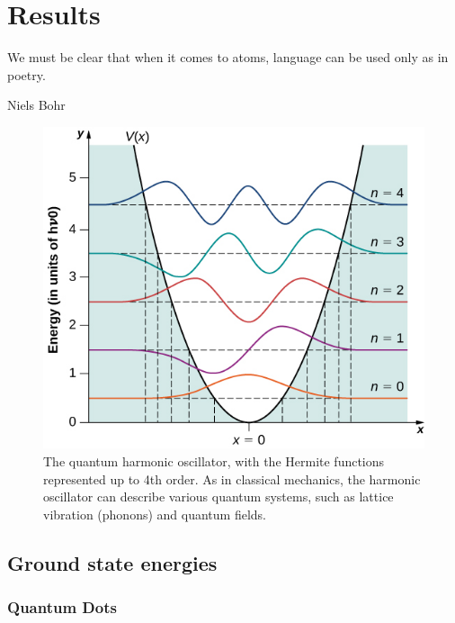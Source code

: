 \chapter{Results} \label{sec:results}
\epigraph{We must be clear that when it comes to atoms, language can be used only as in poetry.}{Niels Bohr}
\begin{figure}[H]
	\centering
	\includegraphics[scale=0.9]{Images/qho.jpg}
	\caption{The quantum harmonic oscillator, with the Hermite functions represented up to 4th order. As in classical mechanics, the harmonic oscillator can describe various quantum systems, such as lattice vibration (phonons) and quantum fields.}
\end{figure}

\section{Ground state energies}
\subsection{Quantum Dots}
